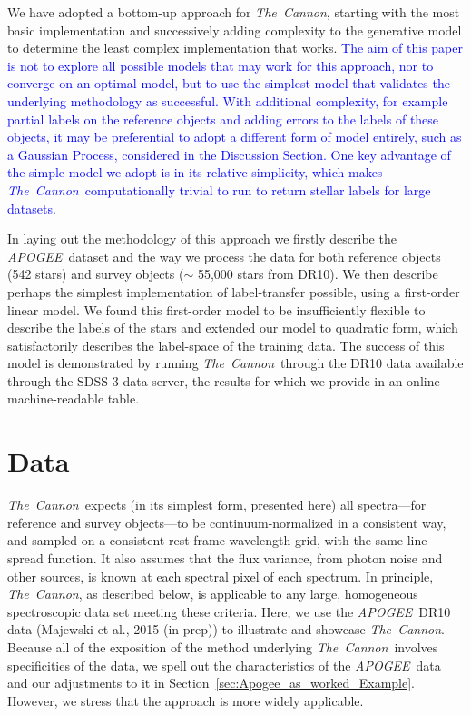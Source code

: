 \documentclass[12pt, preprint]{aastex}
\newcommand{\sectionname}{Section}
\newcommand{\tc}{\textsl{The~Cannon}}
\newcommand{\apogee}{\textsl{APOGEE}}
\begin{document}
We have adopted a bottom-up approach for \tc, starting with the most basic implementation and successively adding complexity to the generative model to determine the least complex implementation that works.  \textcolor{blue}{The aim of this paper is not to explore all possible models that may work for this approach, nor to converge on an optimal model, but to use the simplest model that validates the underlying methodology as successful. With additional complexity, for example partial labels on the reference objects and adding errors to the labels of these objects, it may be preferential to adopt a different form of model entirely, such as a Gaussian Process, considered in the Discussion Section. One key advantage of the simple model we adopt is in its relative simplicity, which makes \tc\ computationally trivial to run to return stellar labels for large datasets.} 

In laying out the methodology of this approach we firstly describe the \apogee\ dataset and the way we process the data for both reference objects (542 stars) and survey objects ($\sim$ 55,000 stars from DR10). 
We then describe perhaps the simplest implementation of label-transfer possible, using a first-order linear model. We found this first-order model to be insufficiently flexible to describe the labels of the stars and extended our model to quadratic form, which satisfactorily describes the label-space of the training data.
The success of this model is demonstrated by running \tc\ through the DR10 data available through the SDSS-3 data server, the results for which we provide in an online machine-readable table. %

\section{Data}\label{sec:Data}
\tc\ expects (in its simplest form, presented here)
all spectra---for reference and survey objects---to be continuum-normalized in a consistent way,
and sampled on a consistent rest-frame wavelength grid, with the same line-spread function.
It also assumes that the flux variance, from photon noise and other sources, is known at each spectral pixel of each spectrum.
In principle, \tc, as described below, is applicable to any large, homogeneous spectroscopic data set
meeting these criteria.
Here, we use the \apogee\ DR10 data (Majewski et al., 2015 (in prep)) to illustrate and showcase \tc.
Because all of the exposition of the method underlying \tc\ involves specificities of the data,
we spell out the characteristics of the \apogee\ data and our adjustments to it in \sectionname~\ref{sec:Apogee_as_worked_Example}. However, we stress that the approach is more widely applicable. 
\end{document}
